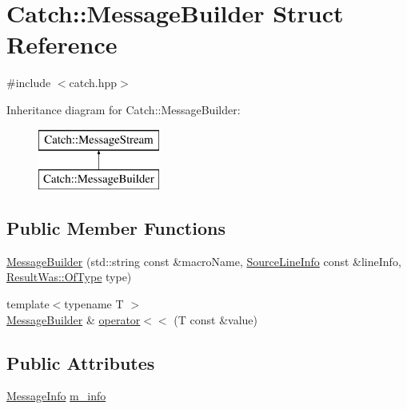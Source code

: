 \hypertarget{structCatch_1_1MessageBuilder}{}\section{Catch\+:\+:Message\+Builder Struct Reference}
\label{structCatch_1_1MessageBuilder}


{\ttfamily \#include $<$catch.\+hpp$>$}

Inheritance diagram for Catch\+:\+:Message\+Builder\+:\begin{figure}[H]
\begin{center}
\leavevmode
\includegraphics[height=2.000000cm]{structCatch_1_1MessageBuilder}
\end{center}
\end{figure}
\subsection*{Public Member Functions}
\begin{DoxyCompactItemize}
\item 
\mbox{\hyperlink{structCatch_1_1MessageBuilder_ab0c6378e722680bf58852c6ee2b6e724}{Message\+Builder}} (std\+::string const \&macro\+Name, \mbox{\hyperlink{structCatch_1_1SourceLineInfo}{Source\+Line\+Info}} const \&line\+Info, \mbox{\hyperlink{structCatch_1_1ResultWas_a624e1ee3661fcf6094ceef1f654601ef}{Result\+Was\+::\+Of\+Type}} type)
\item 
{\footnotesize template$<$typename T $>$ }\\\mbox{\hyperlink{structCatch_1_1MessageBuilder}{Message\+Builder}} \& \mbox{\hyperlink{structCatch_1_1MessageBuilder_a20fa48d069b20dddcc2d3df8abb123c1}{operator$<$$<$}} (T const \&value)
\end{DoxyCompactItemize}
\subsection*{Public Attributes}
\begin{DoxyCompactItemize}
\item 
\mbox{\hyperlink{structCatch_1_1MessageInfo}{Message\+Info}} \mbox{\hyperlink{structCatch_1_1MessageBuilder_a979f1c2b36d78f80ee275bfa5ba0209f}{m\+\_\+info}}
\end{DoxyCompactItemize}


